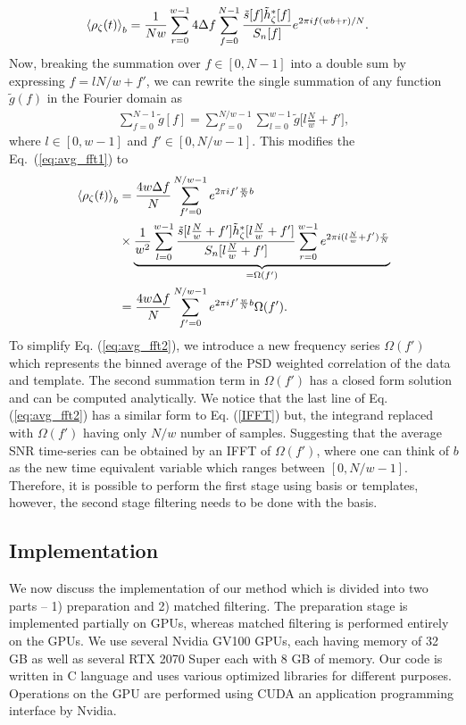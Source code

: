 \begin{align}
    \Braket{\rho_{\zeta}(t)}_b & = \dfrac{1}{Nw} \sum \limits_{r=0}^{w-1} 4 \Delta f \sum \limits_{f=0}^{N-1}\dfrac{\tilde{s}[f]\tilde{h}_{\zeta}^*[f]}{S_n[f]}e^{2\pi i f(wb+r)/N}. \label{eq:avg_fft1}
\end{align}
Now, breaking the summation over $f \in [0,N-1]$ into a double sum by expressing $f = lN/w + f'$, we can rewrite the single summation of any function $\tilde{g}(f)$ in the Fourier domain as
\begin{align}
    \label{eq:double-sum}
    \sum \limits_{f = 0}^{N-1} \tilde{g}[f] = \sum \limits_{f'=0}^{N/w-1} \sum \limits_{l=0}^{w-1} \tilde{g}\Big[l\frac{N}{w} + f'\Big],
\end{align}
where $l \in [0,w-1]$ and $f' \in [0, N/w-1]$. This modifies the Eq.~(\ref{eq:avg_fft1}) to 
\begin{align}
\label{eq:avg_fft2}
\begin{split}
    \Braket{\rho_{\zeta}(t)}_b &= \dfrac{4 w\Delta f}{N}\sum \limits_{f'=0}^{N/w-1} e^{2 \pi if' \frac{w}{N}b} 
    \\
    &\times \underbrace{\dfrac{1}{w^2}\sum \limits_{l=0}^{w-1} \dfrac{\tilde{s}[l\frac{N}{w} + f']\tilde{h}_{\zeta}^*[l\frac{N}{w} + f']}{S_n[l\frac{N}{w} + f']} \sum \limits_{r = 0}^{w-1} e^{2\pi i(l\frac{N}{w} + f')\frac{r}{N}}}_{=\Omega(f')}
    \\
    & = \dfrac{4w\Delta f}{N}\sum \limits_{f'=0}^{N/w-1} e^{2\pi i f'\frac{w}{N}b} \Omega(f').
\end{split}
\end{align}
To simplify Eq. (\ref{eq:avg_fft2}), we introduce a new frequency series $\Omega(f')$ which represents the binned average of the PSD weighted correlation of the data and template. The second summation term in $\Omega(f')$ has a closed form solution and can be computed analytically. We notice that the last line of Eq. (\ref{eq:avg_fft2}) has a similar form to Eq. (\ref{IFFT}) but, the integrand replaced with $\Omega(f')$ having only $N/w$ number of samples. Suggesting that the average SNR time-series can be obtained by an IFFT of $\Omega(f')$, where one can think of $b$ as the new time equivalent variable which ranges between $[0, N/w-1]$. Therefore, it is possible to perform the first stage using basis or templates, however, the second stage filtering needs to be done with the basis.

\subsection{Implementation}
We now discuss the implementation of our method which is divided into two parts -- 1) preparation and 2) matched filtering. The preparation stage is implemented partially on GPUs, whereas matched filtering is performed entirely on the GPUs. We use several Nvidia GV100 GPUs, each having memory of 32 GB as well as several RTX 2070 Super each with 8 GB of memory. Our code is written in C language and uses various optimized libraries for different purposes. Operations on the GPU are performed using CUDA \cite{CUDA} an application programming interface by Nvidia.

